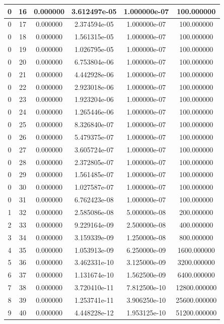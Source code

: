 \documentclass[a4paper,12pt, titlepage]{article}
\begin{document}
\begin{flushleft}
\begin{tabular}{|c|c|c|c|c|c|}
\hline
 0 & 16 & 0.000000 & 3.612497e-05 & 1.000000e-07 & 100.000000\\
\hline
 0 & 17 & 0.000000 & 2.374594e-05 & 1.000000e-07 & 100.000000\\
\hline
 0 & 18 & 0.000000 & 1.561315e-05 & 1.000000e-07 & 100.000000\\
\hline
 0 & 19 & 0.000000 & 1.026795e-05 & 1.000000e-07 & 100.000000\\
\hline
 0 & 20 & 0.000000 & 6.753804e-06 & 1.000000e-07 & 100.000000\\
\hline
 0 & 21 & 0.000000 & 4.442928e-06 & 1.000000e-07 & 100.000000\\
\hline
 0 & 22 & 0.000000 & 2.923018e-06 & 1.000000e-07 & 100.000000\\
\hline
 0 & 23 & 0.000000 & 1.923204e-06 & 1.000000e-07 & 100.000000\\
\hline
 0 & 24 & 0.000000 & 1.265446e-06 & 1.000000e-07 & 100.000000\\
\hline
 0 & 25 & 0.000000 & 8.326840e-07 & 1.000000e-07 & 100.000000\\
\hline
 0 & 26 & 0.000000 & 5.479375e-07 & 1.000000e-07 & 100.000000\\
\hline
 0 & 27 & 0.000000 & 3.605724e-07 & 1.000000e-07 & 100.000000\\
\hline
 0 & 28 & 0.000000 & 2.372805e-07 & 1.000000e-07 & 100.000000\\
\hline
 0 & 29 & 0.000000 & 1.561485e-07 & 1.000000e-07 & 100.000000\\
\hline
 0 & 30 & 0.000000 & 1.027587e-07 & 1.000000e-07 & 100.000000\\
\hline
 0 & 31 & 0.000000 & 6.762423e-08 & 1.000000e-07 & 100.000000\\
\hline
 1 & 32 & 0.000000 & 2.585086e-08 & 5.000000e-08 & 200.000000\\
\hline
 2 & 33 & 0.000000 & 9.229164e-09 & 2.500000e-08 & 400.000000\\
\hline
 3 & 34 & 0.000000 & 3.159339e-09 & 1.250000e-08 & 800.000000\\
\hline
 4 & 35 & 0.000000 & 1.053913e-09 & 6.250000e-09 & 1600.000000\\
\hline
 5 & 36 & 0.000000 & 3.462331e-10 & 3.125000e-09 & 3200.000000\\
\hline
 6 & 37 & 0.000000 & 1.131674e-10 & 1.562500e-09 & 6400.000000\\
\hline
 7 & 38 & 0.000000 & 3.720410e-11 & 7.812500e-10 & 12800.000000\\
\hline
 8 & 39 & 0.000000 & 1.253741e-11 & 3.906250e-10 & 25600.000000\\
\hline
 9 & 40 & 0.000000 & 4.448228e-12 & 1.953125e-10 & 51200.000000\\
\hline
\end{tabular}
\end{flushleft}
\end{document}
